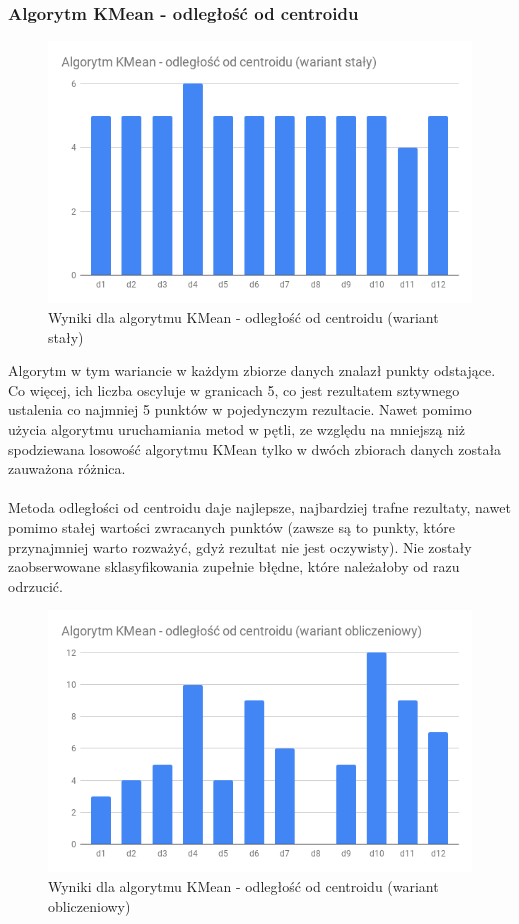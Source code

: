 \documentclass[eng,printmode]{mgr}
\begin{document}
\subsubsection{Algorytm KMean - odległość od centroidu}
\begin{figure}[H]
  \begin{center}
  \includegraphics[scale=0.7]{r_dist_f}
  \end{center}
  \caption{Wyniki dla algorytmu KMean - odległość od centroidu (wariant stały)}
  \label{fig:r_dist_f}
\end{figure}
Algorytm w tym wariancie w każdym zbiorze danych znalazł punkty odstające. Co więcej, ich liczba oscyluje w granicach 5, co jest rezultatem sztywnego ustalenia co najmniej 5 punktów w pojedynczym rezultacie. Nawet pomimo użycia algorytmu uruchamiania metod w pętli, ze względu na mniejszą niż spodziewana losowość algorytmu KMean tylko w dwóch zbiorach danych została zauważona różnica.
\\\\
Metoda odległości od centroidu daje najlepsze, najbardziej trafne rezultaty, nawet pomimo stałej wartości zwracanych punktów (zawsze są to punkty, które przynajmniej warto rozważyć, gdyż rezultat nie jest oczywisty). Nie zostały zaobserwowane sklasyfikowania zupełnie błędne, które należałoby od razu odrzucić.
\\
\begin{figure}[H]
  \begin{center}
  \includegraphics[scale=0.7]{r_dist_c}
  \end{center}
  \caption{Wyniki dla algorytmu KMean - odległość od centroidu (wariant obliczeniowy)}
  \label{fig:r_dist_c}
\end{figure}
\end{document}
